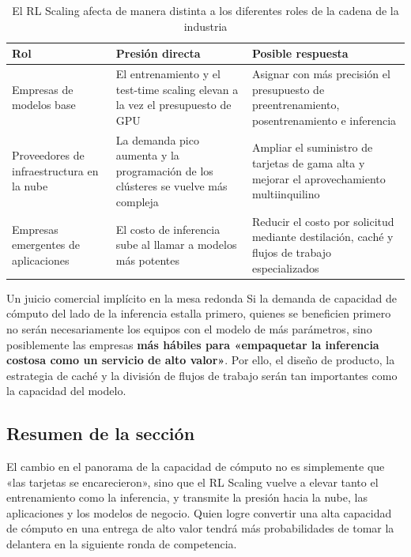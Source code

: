 \begin{table}[H]
\centering
\begin{tabular}{p{3.2cm}p{5.2cm}p{5cm}}
\toprule
Rol & Presión directa & Posible respuesta \\
\midrule
Empresas de modelos base & El entrenamiento y el test-time scaling elevan a la vez el presupuesto de GPU & Asignar con más precisión el presupuesto de preentrenamiento, posentrenamiento e inferencia \\
Proveedores de infraestructura en la nube & La demanda pico aumenta y la programación de los clústeres se vuelve más compleja & Ampliar el suministro de tarjetas de gama alta y mejorar el aprovechamiento multiinquilino \\
Empresas emergentes de aplicaciones & El costo de inferencia sube al llamar a modelos más potentes & Reducir el costo por solicitud mediante destilación, caché y flujos de trabajo especializados \\
\bottomrule
\end{tabular}
\caption{El RL Scaling afecta de manera distinta a los diferentes roles de la cadena de la industria}
\end{table}

\begin{knowledgebox}{Un juicio comercial implícito en la mesa redonda}
Si la demanda de capacidad de cómputo del lado de la inferencia estalla primero, quienes se beneficien primero no serán necesariamente los equipos con el modelo de más parámetros, sino posiblemente las empresas \textbf{más hábiles para «empaquetar la inferencia costosa como un servicio de alto valor»}. Por ello, el diseño de producto, la estrategia de caché y la división de flujos de trabajo serán tan importantes como la capacidad del modelo.
\end{knowledgebox}

\subsection{Resumen de la sección}
El cambio en el panorama de la capacidad de cómputo no es simplemente que «las tarjetas se encarecieron», sino que el RL Scaling vuelve a elevar tanto el entrenamiento como la inferencia, y transmite la presión hacia la nube, las aplicaciones y los modelos de negocio. Quien logre convertir una alta capacidad de cómputo en una entrega de alto valor tendrá más probabilidades de tomar la delantera en la siguiente ronda de competencia.

